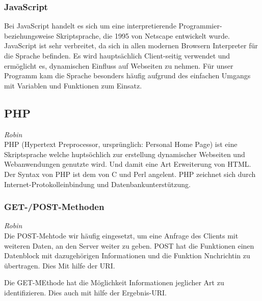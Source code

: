 \documentclass[12pt,a4paper,bibliography=totocnumbered,listof=totocnumbered]{scrartcl}
\begin{document}
\subsubsection{JavaScript}
\label{sec:JavaScript}
Bei JavaScript handelt es sich um eine interpretierende Programmier- beziehungsweise Skriptsprache, die 1995 von Netscape entwickelt wurde.\cite{JavaScript}\cite{wiki/JavaScript} JavaScript ist sehr verbreitet, da sich in allen modernen Browsern Interpreter für die Sprache befinden. Es wird hauptsächlich Client-seitig verwendet und ermöglicht es, dynamischen Einfluss auf Webseiten zu nehmen.\cite{JavaScript-JS} Für unser Programm kam die Sprache besonders häufig aufgrund des einfachen Umgangs mit Variablen und Funktionen zum Einsatz.

\subsection{PHP}
\label{sec:PHP}
\emph{Robin}\\
PHP (Hypertext Preprocessor, ursprünglich: Personal Home Page) ist eine Skriptsprache welche huptsöchlich zur erstellung dynamischer Webseiten und Webanwendungen genutzte wird. Und damit eine Art Erweiterung von HTML. Der Syntax von PHP ist dem von C und Perl angelent. PHP zeichnet sich durch Internet-Protokolleinbindung und Datenbankunterstützung.
 \cite{PHP}


\subsubsection{GET-/POST-Methoden}
\emph{Robin}\\
Die POST-Mehtode wir häufig eingesetzt, um eine Anfrage des Clients mit weiteren Daten, an den Server weiter zu geben. POST hat die Funktionen einen Datenblock mit dazugehörigen Informationen und die Funktion Nnchrichtin zu übertragen. Dies Mit hilfe der URI.

Die GET-MEthode hat die Möglichkeit Informationen jeglicher Art zu identifizieren. Dies auch mit hilfe der Ergebnis-URI.
\cite{GETPOST}
\end{document}
